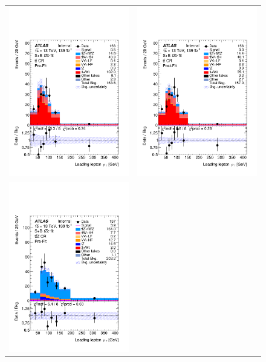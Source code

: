\begin{figure}[htbp]
	\centering
	\begin{tabular}{cc}
		\includegraphics[width=.45\textwidth]{Appendices/AP9/figures/SPLUSB_CRSR_UsingBaseFullSys/Plots/TTCR} &
		\includegraphics[width=.45\textwidth]{Appendices/AP9/figures/SPLUSB_CRSR_UsingBaseFullSys/Plots/TTCR_postFit} \\
		\includegraphics[width=.45\textwidth]{Appendices/AP9/figures/SPLUSB_CRSR_UsingBaseFullSys/Plots/TTZCR} &

\end{tabular}
\end{figure}
